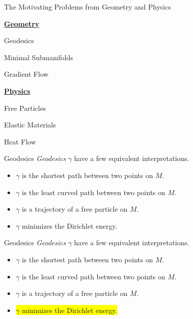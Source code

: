\documentclass[usenames,dvipsnames]{beamer}
\theoremstyle{definition}
\theoremstyle{theorem}
\begin{document}
        
        \begin{frame}{The Motivating Problems from Geometry and Physics}
        \begin{itemize}
\begin{minipage}{0.55\linewidth}
    \item[] \textbf{\underline{Geometry}}
    \item Geodesics
    \item Minimal Submanifolds
    \item Gradient Flow
\end{minipage}
\begin{minipage}{0.4\linewidth}
    \item[] \textbf{\underline{Physics}}
    \item Free Particles
    \item Elastic Materials
    \item Heat Flow
\end{minipage}
\end{itemize}
            

        \end{frame}
        
        \begin{frame}{Geodesics}
            \emph{Geodesics} $\gamma$ have a few equivalent interpretations.
            \begin{itemize}
                \item $\gamma$ is the shortest path between two points on $M$.
                \item $\gamma$ is the least curved path between two points on $M$.
                \item $\gamma$ is a trajectory of a free particle on $M$.
                \item $\gamma$ minimizes the Dirichlet energy.
            \end{itemize}
        \end{frame}
        
            \begin{frame}{Geodesics}
            \emph{Geodesics} $\gamma$ have a few equivalent interpretations.
            \begin{itemize}
                \item $\gamma$ is the shortest path between two points on $M$.
                \item $\gamma$ is the least curved path between two points on $M$.
                \item $\gamma$ is a trajectory of a free particle on $M$.
                \item \colorbox<1>{yellow}{$\gamma$ minimizes the Dirichlet energy.}
            \end{itemize}
        \end{frame}
        
\end{document}
